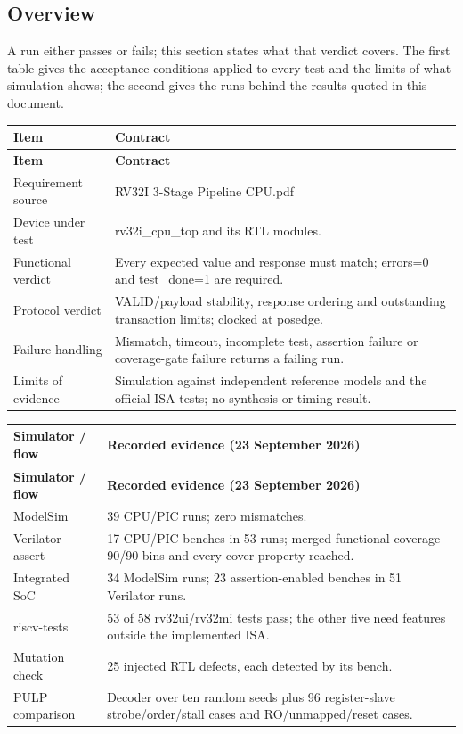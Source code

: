 \documentclass[11pt]{article}
\begin{document}
\subsection{Overview}
\noindent A run either passes or fails; this section states what that verdict covers. The first table gives the acceptance conditions applied to every test and the limits of what simulation shows; the second gives the runs behind the results quoted in this document.\par\medskip
{\small
\begin{longtable}{@{}L{0.2900\dimexpr\linewidth-12pt\relax}L{0.7100\dimexpr\linewidth-12pt\relax}@{}}
\toprule
\textbf{Item} & \textbf{Contract} \\ \midrule
\endfirsthead
\toprule
\textbf{Item} & \textbf{Contract} \\ \midrule
\endhead
Requirement source & RV32I 3-Stage Pipeline CPU.pdf \\ \addlinespace[3pt]
Device under test & rv32i\_cpu\_top and its RTL modules. \\ \addlinespace[3pt]
Functional verdict & Every expected value and response must match; errors=0 and test\_done=1 are required. \\ \addlinespace[3pt]
Protocol verdict & VALID/payload stability, response ordering and outstanding transaction limits; clocked at posedge. \\ \addlinespace[3pt]
Failure handling & Mismatch, timeout, incomplete test, assertion failure or coverage-gate failure returns a failing run. \\ \addlinespace[3pt]
Limits of evidence & Simulation against independent reference models and the official ISA tests; no synthesis or timing result. \\*
\bottomrule\end{longtable}}
{\small
\begin{longtable}{@{}L{0.2900\dimexpr\linewidth-12pt\relax}L{0.7100\dimexpr\linewidth-12pt\relax}@{}}
\toprule
\textbf{Simulator / flow} & \textbf{Recorded evidence (23 September 2026)} \\ \midrule
\endfirsthead
\toprule
\textbf{Simulator / flow} & \textbf{Recorded evidence (23 September 2026)} \\ \midrule
\endhead
ModelSim & 39 CPU/PIC runs; zero mismatches. \\ \addlinespace[3pt]
Verilator --assert & 17 CPU/PIC benches in 53 runs; merged functional coverage 90/90 bins and every cover property reached. \\ \addlinespace[3pt]
Integrated SoC & 34 ModelSim runs; 23 assertion-enabled benches in 51 Verilator runs. \\ \addlinespace[3pt]
riscv-tests & 53 of 58 rv32ui/rv32mi tests pass; the other five need features outside the implemented ISA. \\ \addlinespace[3pt]
Mutation check & 25 injected RTL defects, each detected by its bench. \\ \addlinespace[3pt]
PULP comparison & Decoder over ten random seeds plus 96 register-slave strobe/order/stall cases and RO/unmapped/reset cases. \\*
\bottomrule\end{longtable}}
\end{document}

